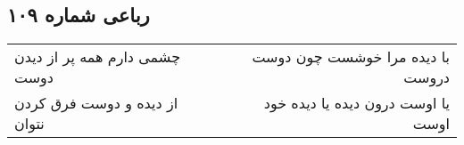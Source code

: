 \begin{center}
\section*{رباعی شماره ۱۰۹}
\label{sec:sh109}
\begin{longtable}{l p{0.5cm} r}
چشمی دارم همه پر از دیدن دوست
&&
با دیده مرا خوشست چون دوست دروست
\\
از دیده و دوست فرق کردن نتوان
&&
یا اوست درون دیده یا دیده خود اوست
\\
\end{longtable}
\end{center}
